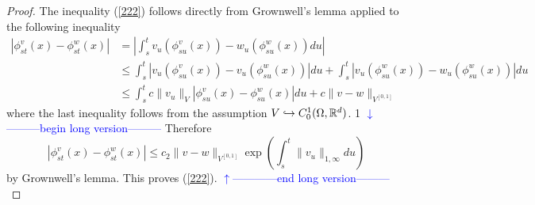 \documentclass[noinfoline]{imsart}
\def\Ver{1}
\def\LongVer{1}
\begin{document}
\begin{proof}
The inequality (\ref{222})  follows directly from Grownwell's lemma  applied to the following inequality
\begin{align*}
|\phi_{st}^v(x) - \phi_{st}^w(x)| &= \left| \int_{s}^t v_u (\phi_{su}^v(x)) -  w_u (\phi_{su}^w(x)) du\right|\\
&\leq \int_{s}^t |v_u (\phi_{su}^v(x)) -  v_u (\phi_{su}^w(x)) |du + \int_{s}^t |v_u (\phi_{su}^w(x)) -  w_u (\phi_{su}^w(x)) |du\\
& \leq \int_{s}^t c\|v_u\|_{V} |\phi_{su}^v(x) -  \phi_{su}^w(x)|du  +  c\|v - w  \|_{V^{[0,1]}}
\end{align*}
where the last inequality follows from the assumption $V\hookrightarrow C_0^1(\Omega, \Bbb R^d)$.
\if\Ver\LongVer{ 
{\flushleft\textcolor{blue}{$\downarrow$---------begin long version---------}}\newline
 Therefore 
 \[  |\phi_{st}^v(x) - \phi_{st}^w(x)| \leq  c_2\|v - w  \|_{V^{[0,1]}} \exp\left( \int_{s}^t \|v_u\|_{1,\infty}  du \right) \]
 by Grownwell's lemma.  This proves (\ref{222}).
 {\flushleft\textcolor{blue}{$\uparrow$------------end long version---------}}\newline
} \fi



 
 

\end{proof}
\end{document}
